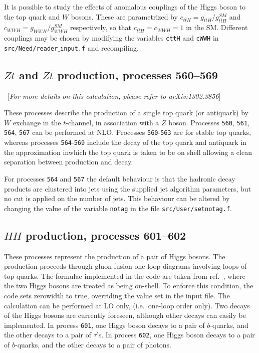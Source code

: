 \documentclass{article}
\begin{document}
{{{{{{It is possible to study the effects of anomalous couplings of the Higgs boson to the top quark and $W$ bosons. These are parametrized by $c_{t\bar{t}H} = g_{t\bar{t}H}/g_{t\bar{t}H}^{SM}$ and $c_{WWH} = g_{WWH}/g_{WWH}^{SM}$ respectively, so that $c_{t\bar{t}H}=c_{WWH}=1$ in the SM. Different couplings may be chosen by modifying the variables {\tt cttH} and {\tt cWWH} in {\tt src/Need/reader$\_$input.f} and recompiling.

\subsection{$Zt$ and $Z\bar{t}$ production, processes 560--569}\
[{\it For more details on this calculation, please refer to arXiv:1302.3856}]

\label{subsec:Zt}
These processes describe the production of a single top quark (or antiquark) by $W$ exchange in the
$t$-channel, in association with a $Z$ boson. Processes {\tt 560}, {\tt 561},
{\tt 564}, {\tt 567} can be performed at NLO.
Processes {\tt  560}-{\tt 563} are for stable top quarks, whereas processes {\tt 564}-{\tt 569}
include the decay of the top quark and antiquark
in the approximation inwhich the top quark is taken to
be on shell allowing a clean separation
between production and decay.

For processes {\tt 564} and {\tt 567} the default behaviour is that the hadronic decay products
are clustered into jets using the supplied jet
algorithm parameters, but no cut is applied on the number of jets.
This behaviour can be altered by changing the value of the
variable {\tt notag} in the file {\tt src/User/setnotag.f}.

\subsection{$HH$ production, processes 601--602}
These processes represent the production of a pair of Higgs bosons.
The production proceeds through gluon-fusion one-loop diagrams involving loops 
of top quarks. The formulae implemented in the code are taken from ref.~\cite{Glover:1987nx},
where the two Higgs bosons are treated as being on-shell. To enforce this 
condition, the code sets zerowidth to true, overriding the value set in the input file.
The calculation can be performed at LO only, (i.e.\ one-loop order only).
Two decays of the Higgs bosons are currently foreseen, although other decays can easily be implemented. 
In process {\tt 601}, one Higgs boson decays to
a pair of $b$-quarks, and the other decays to a pair of $\tau$'s.
In process {\tt 602}, one Higgs boson decays to
a pair of $b$-quarks, and the other decays to a pair of photons.

}}}}}}
\end{document}

